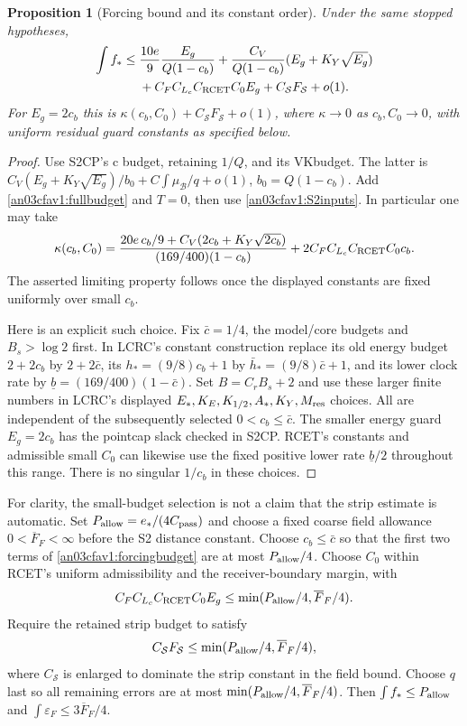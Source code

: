 \documentclass[11pt]{article}
\newtheorem{proposition}[theorem]{Proposition}
\theoremstyle{remark}\newtheorem{remark}[theorem]{Remark}
\newcommand{\BB}{\mathcal B}
\newcommand{\eps}{\varepsilon}
\begin{document}
\begin{proposition}[Forcing bound and its constant order]
\label{an03cfav1:forcing}
Under the same stopped hypotheses,
\begin{align}
 \int f_*
 \le{}&\frac{10e}{9}\frac{E_g}{Q(1-c_b)}
 +\frac{C_V}{Q(1-c_b)}(E_g+K_Y\sqrt{E_g})\nonumber\\
 &+C_F C_{L_c}C_{\rm RCET}C_0E_g
 +C_{\mathcal S}F_{\mathcal S}+o(1).
 \label{an03cfav1:forcingbudget}
\end{align}
For $E_g=2c_b$ this is
$\kappa(c_b,C_0)+C_{\mathcal S}F_{\mathcal S}+o(1)$,
where $\kappa\to0$ as $c_b,C_0\to0$, with uniform residual
guard constants as specified below.
\end{proposition}
\begin{proof}
Use S2CP's c budget, retaining $1/Q$, and its VKbudget.
The latter is
$C_V(E_g+K_Y\sqrt{E_g})/b_0+C\int\mu_{\BB}/q+o(1)$,
$b_0=Q(1-c_b)$. Add \eqref{an03cfav1:fullbudget} and
$T=0$, then use \eqref{an03cfav1:S2inputs}. In particular
one may take
\[
 \kappa(c_b,C_0)=
 \frac{20e\,c_b/9+C_V(2c_b+K_Y\sqrt{2c_b})}
      {(169/400)(1-c_b)}
       +2C_F C_{L_c}C_{\rm RCET}C_0c_b.
\]
The asserted limiting property follows once the displayed
constants are fixed uniformly over small $c_b$.

Here is an explicit such choice. Fix $\bar c=1/4$, the
model/core budgets and $B_s>\log2$ first. In LCRC's constant
construction replace its old energy budget $2+2c_b$ by
$2+2\bar c$, its $h_*=(9/8)c_b+1$ by
$\bar h_*=(9/8)\bar c+1$, and its lower clock rate by
$\underline b=(169/400)(1-\bar c)$.
Set $B=C_rB_s+2$ and use these larger finite numbers in
LCRC's displayed $E_*,K_E,K_{1/2},A_*,K_Y,M_{\rm res}$
choices. All are independent of the subsequently selected
$0<c_b\le\bar c$. The smaller energy guard $E_g=2c_b$
has the pointcap slack checked in S2CP. RCET's constants
and admissible small $C_0$ can likewise use the fixed
positive lower rate $\underline b/2$ throughout this range.
There is no singular $1/c_b$ in these choices.
\end{proof}

For clarity, the small-budget selection is not a claim that
the strip estimate is automatic. Set
$P_{\rm allow}=e_*/(4C_{\rm pass})$ and choose a fixed
coarse field allowance $0<\overline F_F<\infty$ before
the S2 distance constant. Choose $c_b\le\bar c$ so that
the first two terms of \eqref{an03cfav1:forcingbudget}
are at most $P_{\rm allow}/4$.
Choose $C_0$ within RCET's uniform admissibility and the
receiver-boundary margin, with
\[
 C_F C_{L_c}C_{\rm RCET}C_0E_g
       \le\min(P_{\rm allow}/4,\overline F_F/4).
\]
Require the retained strip budget to satisfy
\begin{equation}
 C_{\mathcal S}F_{\mathcal S}
       \le\min(P_{\rm allow}/4,\overline F_F/4),
 \label{an03cfav1:stripsmall}
\end{equation}
where $C_{\mathcal S}$ is enlarged to dominate the strip
constant in the field bound. Choose $q$ last so all remaining
errors are at most $\min(P_{\rm allow}/4,\overline F_F/4)$.
Then $\int f_*\le P_{\rm allow}$ and
$\int\eps_F\le3\overline F_F/4$.
\end{document}

